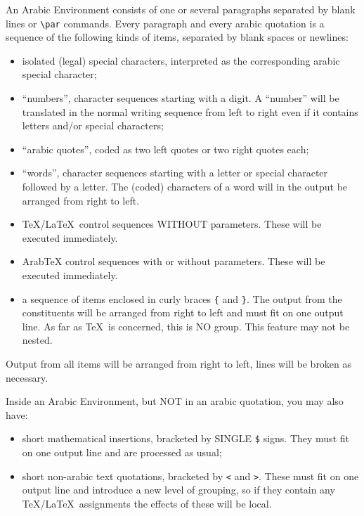 \documentclass[pagesize=auto]{scrartcl}
\makeatletter
\newcommand*{\ArabTeX}{Arab\kern-0.12em\TeX\@\xspace}
\def\ArabTeX{ArabTeX\xspace}%
\makeatother
\begin{document}
An Arabic Environment consists of one or several paragraphs separated by 
blank lines or \verb+\par+ commands. Every paragraph and every arabic quotation 
is a sequence of the following kinds of items, separated by blank spaces 
or newlines: 
%
\begin{itemize}
\item isolated (legal) special characters, interpreted as the corresponding 
  arabic special character; 
\item ``numbers'', character sequences starting with a digit. A ``number'' will be 
  translated in the normal writing sequence from left to right even if it 
  contains letters and/or special characters;
\item ``arabic quotes'', coded as two left quotes or two right quotes each;
\item ``words'', character sequences starting with a letter or special character 
  followed by a letter. The (coded) characters of a word will in the 
  output be arranged from right to left. 
\item \TeX/\LaTeX\ control sequences WITHOUT parameters. These will be executed 
  immediately. 
\item \ArabTeX control sequences with or without parameters. These will be
  executed immediately.
\item a sequence of items enclosed in curly braces \verb+{+ and \verb+}+. The output from 
  the constituents will be arranged from right to left and must fit on one 
  output line. As far as \TeX\ is concerned, this is NO group. This feature 
  may not be nested. 
\end{itemize}

Output from all items will be arranged from right to left, lines will be 
broken as necessary. 

Inside an Arabic Environment, but NOT in an arabic quotation, you may also 
have: 

\begin{itemize}
\item short mathematical insertions, bracketed by SINGLE \verb+$+ signs. They must 
  fit on one output line and are processed as usual; 
\item short non-arabic text quotations, bracketed by \verb+<+ and \verb+>+. These must fit 
  on one output line and introduce a new level of grouping, so if they 
  contain any \TeX/\LaTeX\ assignments the effects of these will be local.
\end{itemize}
\end{document}

